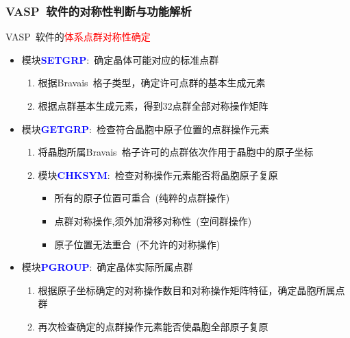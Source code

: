 \documentclass[cjk,slidestop,handout,compress,mathserif,blue]{beamer}	%
\begin{document}
\frame
{
	\frametitle{\textrm{VASP~}软件的对称性判断与功能解析}
	\textrm{VASP~}软件的\textcolor{red}{体系点群对称性确定}
	\begin{itemize}
		\item 模块\textcolor{blue}{\textbf{SETGRP}}:~确定晶体可能对应的标准点群
			\begin{enumerate}
				\item 根据\textrm{Bravais~}格子类型，确定许可点群的基本生成元素
				\item 根据点群基本生成元素，得到32点群全部对称操作矩阵
			\end{enumerate}
		\item 模块\textcolor{blue}{\textbf{GETGRP}}:~检查符合晶胞中原子位置的点群操作元素
			\begin{enumerate}
				\item 将晶胞所属\textrm{Bravais~}格子许可的点群依次作用于晶胞中的原子坐标
				\item 模块\textcolor{blue}{\textbf{CHKSYM}}:~检查对称操作元素能否将晶胞原子复原
			\begin{itemize}
				\item 所有的原子位置可重合~(纯粹的点群操作)
				\item 点群对称操作,须外加滑移对称性~(空间群操作)
				\item 原子位置无法重合~(不允许的对称操作)
			\end{itemize}
			\end{enumerate}
		\item 模块\textcolor{blue}{\textbf{PGROUP}}:~确定晶体实际所属点群
			\begin{enumerate}
				\item 根据原子坐标确定的对称操作数目和对称操作矩阵特征，确定晶胞所属点群
				\item 再次检查确定的点群操作元素能否使晶胞全部原子复原
			\end{enumerate}
	\end{itemize}
}
\end{document}
